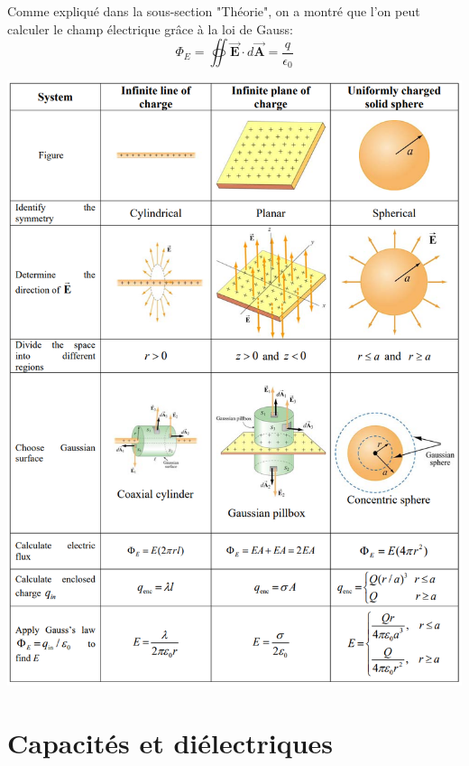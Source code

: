 \documentclass[a4paper]{article}
\begin{document}
Comme expliqué dans la sous-section "Théorie", on a montré que l'on peut calculer le champ électrique grâce à la loi de Gauss: 
\[ \Phi_E = \oiint \vec{\textbf{E}} \cdot d \vec{\textbf{A}} = \frac{q}{\epsilon_0} \]

\begin{center}
\includegraphics[width=\textwidth]{LoiGauss.PNG}
\end{center}























\section{Capacités et diélectriques}
\end{document}
